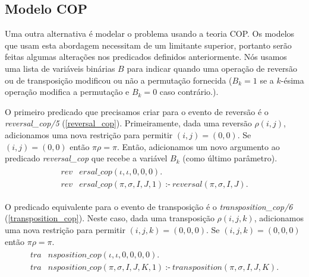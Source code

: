 \subsection{Modelo COP}
\label{subsec:modelcop}
Uma outra alternativa é modelar o problema usando a teoria COP\@. Os
modelos que usam esta abordagem necessitam de um limitante superior,
portanto serão feitas algumas alterações nos predicados definidos
anteriormente. Nós usamos uma lista de variáveis binárias $B$ para
indicar quando uma operação de reversão ou de transposição modificou ou
não a permutação fornecida ($B_k = 1$ se a $k$-ésima operação modifica a
permutação e $B_k = 0$ caso contrário.).

O primeiro predicado que precisamos criar para o evento de reversão é o
\textit{reversal\_cop/5} (\ref{reversal_cop}). Primeiramente, dada uma
reversão $\rho(i, j)$, adicionamos uma nova restrição para permitir $(i,
j) = (0, 0)$. Se $(i, j) = (0, 0)$ então $\pi\rho = \pi$. Então,
adicionamos um novo argumento ao predicado \textit{reversal\_cop} que
recebe a variável $B_k$ (como último parâmetro).
\begin{align}
  \label{reversal_cop}
  \begin{split}
  \textit{rev}&\textit{ersal\_cop}(\iota, \iota, 0, 0, 0). \\
  \textit{rev}&\textit{ersal\_cop}(\pi, \sigma, I, J, 1)~\text{:-}~ 
  \textit{reversal}(\pi, \sigma, I, J).
  \end{split}
\end{align}

O predicado equivalente para o evento de transposição é o
\textit{transposition\_cop/6} (\ref{transposition_cop}). Neste caso,
dada uma transposição $\rho(i, j, k)$, adicionamos uma nova restrição
para permitir $(i, j, k) = (0, 0, 0)$. Se $(i, j, k) = (0, 0, 0)$ então
$\pi\rho = \pi$.
\begin{align}
  \label{transposition_cop}
  \begin{split}
  \textit{tra}&\textit{nsposition\_cop}(\iota, \iota, 0, 0, 0, 0). \\
  \textit{tra}&\textit{nsposition\_cop}(\pi, \sigma, I, J, K, 1)~\text{:-}~ 
  \textit{transposition}(\pi, \sigma, I, J, K). 
  \end{split}
\end{align}


